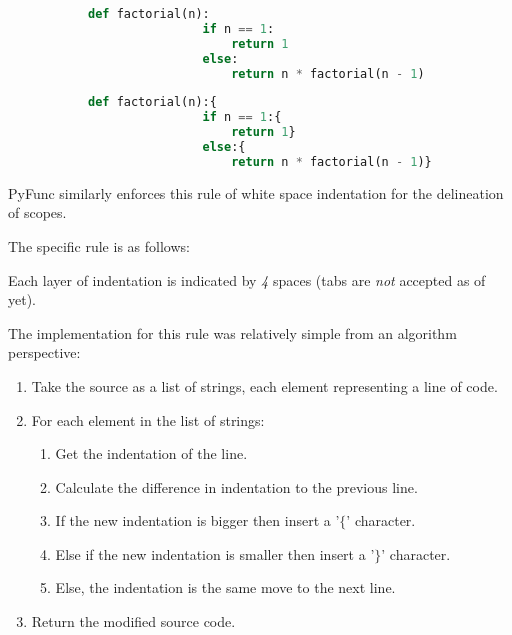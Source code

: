 \documentclass{l4proj}
\begin{document}
\begin{figure}[h]
    \centering
    \begin{subfigure}[b]{0.45\textwidth}
        \begin{lstlisting}[language=Python]
            def factorial(n):
                if n == 1:
                    return 1
                else:
                    return n * factorial(n - 1)
        \end{lstlisting}
    \end{subfigure}
    \begin{subfigure}[b]{0.45\textwidth}
        \begin{lstlisting}[language=Python]
            def factorial(n):{
                if n == 1:{
                    return 1}
                else:{
                    return n * factorial(n - 1)}}
        \end{lstlisting}
    \end{subfigure}
        
\end{figure}

PyFunc similarly enforces this rule of white space indentation for the delineation of scopes.

The specific rule is as follows:

\begin{center}
Each layer of indentation is indicated by \emph{4} spaces (tabs are \emph{not} accepted as of yet).
\end{center}

The implementation for this rule was relatively simple from an algorithm perspective:

\begin{enumerate}
    \item Take the source as a list of strings, each element representing a line of code.
    \item For each element in the list of strings:
    \begin{enumerate}
        \item Get the indentation of the line.
        \item Calculate the difference in indentation to the previous line.
        \item If the new indentation is bigger then insert a '$\{$' character.
        \item Else if the new indentation is smaller then insert a '$\}$' character.
        \item Else, the indentation is the same move to the next line.
    \end{enumerate}
    \item Return the modified source code.
\end{enumerate}
\end{document}
